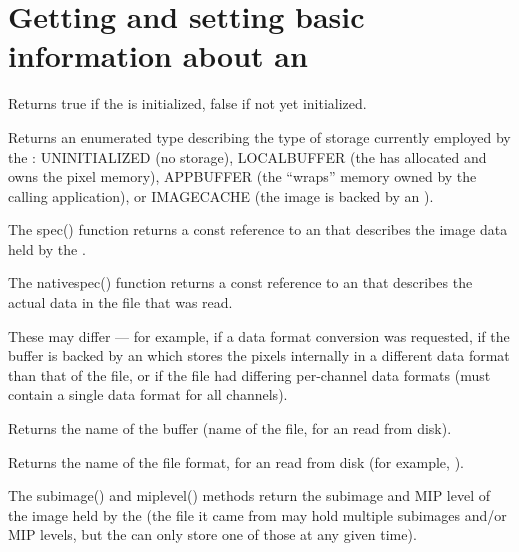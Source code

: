 \section{Getting and setting basic information about an \ImageBuf}

Returns {\cf true} if the \ImageBuf is initialized, {\cf false} if not
yet initialized.
\apiend

Returns an enumerated type describing the type of storage currently employed
by the \ImageBuf: {\cf UNINITIALIZED} (no storage), {\cf LOCALBUFFER} (the
\ImageBuf has allocated and owns the pixel memory), {\cf APPBUFFER} (the
\ImageBuf ``wraps'' memory owned by the calling application), or
{\cf IMAGECACHE} (the image is backed by an \ImageCache).
\apiend


The {\cf spec()} function returns a {\cf const} reference to an
\ImageSpec that describes the image data held by the \ImageBuf.  

The {\cf nativespec()} function returns a {\cf const} reference
to an \ImageSpec that describes the actual data in the file that
was read.

These may differ --- for example, if a data format conversion was
requested, if the buffer is backed by an \ImageCache which stores the
pixels internally in a different data format than that of the file, or
if the file had differing per-channel data formats (\ImageBuf must
contain a single data format for all channels).
\apiend


Returns the name of the buffer (name of the file, for an
\ImageBuf read from disk).
\apiend

Returns the name of the file format, for an \ImageBuf read from disk
(for example, ).
\apiend

The {\cf subimage()} and {\cf miplevel()} methods return the subimage and MIP
level of the image held by the \ImageBuf (the file it came from may hold
multiple subimages and/or MIP levels, but the \ImageBuf can only store
one of those at any given time).

